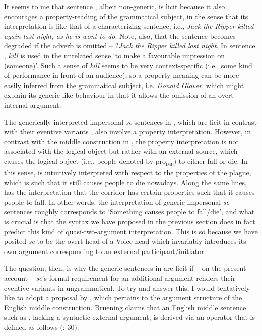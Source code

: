 \documentclass[output=paper,
modfonts,nonflat,
newtxmath
]{langsci/langscibook}
\begin{document}
{It seems to me that sentence , albeit non-generic, is licit because it also encourages a property-reading of the grammatical subject, in the sense that its interpretation is like that of a characterizing sentence; i.e., \textit{Jack the Ripper killed again last  night, as he is wont to do}. Note, also, that the sentence becomes degraded if the adverb is omitted -- ?\textit{Jack the Ripper killed last night}. In sentence , \textit{kill} is used in the unrelated sense `to make a favourable impression on (someone)'. Such a sense of \textit{kill} seems to be very context-specific (i.e., some kind of performance in front of an audience), so a property-meaning can be more easily inferred from the grammatical subject, i.e. \textit{Donald Glover}, which might explain its generic-like behaviour in that it allows the omission of an overt internal argument.}  \par

The generically interpreted impersonal \textit{se}-sentences in , which are licit in contrast with their eventive variants , also involve a property interpretation. However, in contrast with the middle construction in , the property interpretation is not associated with the logical object but rather with an external source, which causes the logical object (i.e., people denoted by pro\textsubscript{\textsc{imp}}) to either fall or die. In this sense,  is intuitively interpreted with respect to the properties of the plague, which is such that it still causes people to die nowadays. Along the same lines,  has the interpretation that the corridor has certain properties such that it causes people to fall. In other words, the interpretation of generic impersonal \textit{se}-sentences roughly corresponds to `Something causes people to fall/die', and what is crucial is that the syntax we have proposed in the previous section does in fact predict this kind of quasi-two-argument interpretation. This is so because we have posited \textit{se} to be the overt head of a Voice head which invariably introduces its own argument corresponding to an external participant/initiator. \par

The question, then, is why the generic sentences in  are licit if -- on the present account -- \textit{se}’s formal requirement for an additional argument renders their eventive variants in  ungrammatical.  To try and answer this, I would tentatively like to adopt a proposal by \citet{bruening2012}, which pertains to the argument structure of the English middle construction.  Bruening claims that an English middle sentence such as , lacking a syntactic external argument, is derived via an operator that is defined as follows (\citealt{bruening2012}: 30): 
\end{document}
